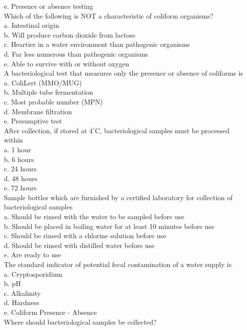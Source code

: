 e. Presence or absence testing\\
  Which of the following is NOT a characteristic of coliform organisms?\\
a. Intestinal origin\\
b. Will produce carbon dioxide from lactose\\
c. Heartier in a water environment than pathogenic organisms\\
d. Far less numerous than pathogenic organisms\\
e. Able to survive with or without oxygen\\
  A bacteriological test that measures only the presence or absence of coliforms is\\
a. ColiLert (MMO/MUG)\\
b. Multiple tube fermentation\\
c. Most probable number (MPN)\\
d. Membrane filtration\\
e. Presumptive test\\
  After collection, if stored at $4^{\circ} \mathrm{C}$, bacteriological samples must be processed within\\
a. 1 hour\\
b. 6 hours\\
c. 24 hours\\
d. 48 hours\\
e. 72 hours\\
  Sample bottles which are furnished by a certified laboratory for collection of bacteriological samples\\
a. Should be rinsed with the water to be sampled before use\\
b. Should be placed in boiling water for at least 10 minutes before use\\
c. Should be rinsed with a chlorine solution before use\\
d. Should be rinsed with distilled water before use\\
e. Are ready to use\\
The standard indicator of potential fecal contamination of a water supply is\\
a. Cryptosporidium\\
b. $\mathrm{pH}$\\
c. Alkalinity\\
d. Hardness\\
e. Coliform Presence - Absence\\
Where should bacteriological samples be collected?\\
